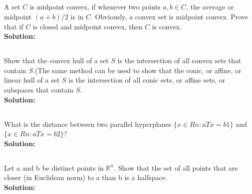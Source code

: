 \documentclass[10pt]{article}
\newcommand{\R}{\mathbb{R}}
\begin{document}
  	
  	\begin{center}
  	\section{}
  	\end{center}\par
  	  	A set $C$ is midpoint convex, if whenever two points $a, b \in C$, the average or midpoint
$(a + b)/2$ is in $C$. Obviously, a convex set is midpoint convex. Prove that if $C$ is closed and
midpoint convex, then $C$ is convex.\\
  	\textbf{Solution:}\par
  	\newpage  	
  	
  	
  	\begin{center}
  	\section{}
  	\end{center}\par
  	  	Show that the convex hull of a set $S$ is the intersection of all convex sets that contain
$S$.(The same method can be used to show that the conic, or affine, or linear hull of a set $S$ is
the intersection of all conic sets, or affine sets, or subspaces that contain $S$.\\
  	\textbf{Solution:}\par
  	\newpage
  	
  	
  	\begin{center}
  	\section{}
  	\end{center}\par
  	What is the distance between two parallel hyperplanes $\{x \in R n : a T x = b 1 \}$ and
$\{x \in R n : a T x = b 2 \}$?\\
  	\textbf{Solution:}\par
  	\newpage
  	
  	
  	\begin{center}
  	\section{}
  	\end{center}\par
  	Let a and b be distinct points in $\R^n$. Show that the set of all points that are closer (in
Euclidean norm) to a than b is a halfspace.\\
  	\textbf{Solution:}\par
  	\newpage
  	
\end{document}
